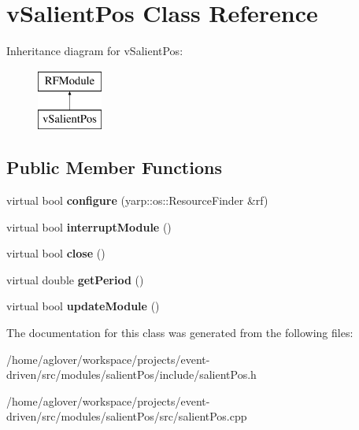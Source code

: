 \hypertarget{classvSalientPos}{}\section{v\+Salient\+Pos Class Reference}
\label{classvSalientPos}
Inheritance diagram for v\+Salient\+Pos\+:\begin{figure}[H]
\begin{center}
\leavevmode
\includegraphics[height=2.000000cm]{classvSalientPos}
\end{center}
\end{figure}
\subsection*{Public Member Functions}
\begin{DoxyCompactItemize}
\item 
virtual bool {\bfseries configure} (yarp\+::os\+::\+Resource\+Finder \&rf)\hypertarget{classvSalientPos_ad46801e5962743b241c9f243e320c329}{}\label{classvSalientPos_ad46801e5962743b241c9f243e320c329}

\item 
virtual bool {\bfseries interrupt\+Module} ()\hypertarget{classvSalientPos_a08cf9e09b085f3886a849ee1d2b077b2}{}\label{classvSalientPos_a08cf9e09b085f3886a849ee1d2b077b2}

\item 
virtual bool {\bfseries close} ()\hypertarget{classvSalientPos_a95f359c8ad4525369cf38b907d79be11}{}\label{classvSalientPos_a95f359c8ad4525369cf38b907d79be11}

\item 
virtual double {\bfseries get\+Period} ()\hypertarget{classvSalientPos_adec841e273c2657901cdac84c7c60013}{}\label{classvSalientPos_adec841e273c2657901cdac84c7c60013}

\item 
virtual bool {\bfseries update\+Module} ()\hypertarget{classvSalientPos_a510d6422462efc0aa7cd413c35046e41}{}\label{classvSalientPos_a510d6422462efc0aa7cd413c35046e41}

\end{DoxyCompactItemize}


The documentation for this class was generated from the following files\+:\begin{DoxyCompactItemize}
\item 
/home/aglover/workspace/projects/event-\/driven/src/modules/salient\+Pos/include/salient\+Pos.\+h\item 
/home/aglover/workspace/projects/event-\/driven/src/modules/salient\+Pos/src/salient\+Pos.\+cpp\end{DoxyCompactItemize}
